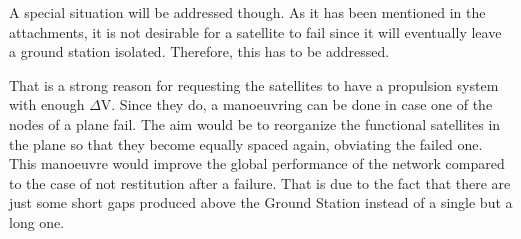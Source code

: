 A special situation will be addressed though. As it has been mentioned in the attachments, it is not desirable for a satellite to fail since it will eventually leave a ground station isolated. Therefore, this has to be addressed. 

That is a strong reason for requesting the satellites to have a propulsion system with enough $\Delta$V. Since they do, a manoeuvring can be done in case one of the nodes of a plane fail. The aim would be to reorganize the functional satellites in the plane so that they become equally spaced again, obviating the failed one. This manoeuvre would improve the global performance of the network compared to the case of not restitution after a failure. That is due to the fact that there are just some short gaps produced above the Ground Station instead of a single but a long one.
